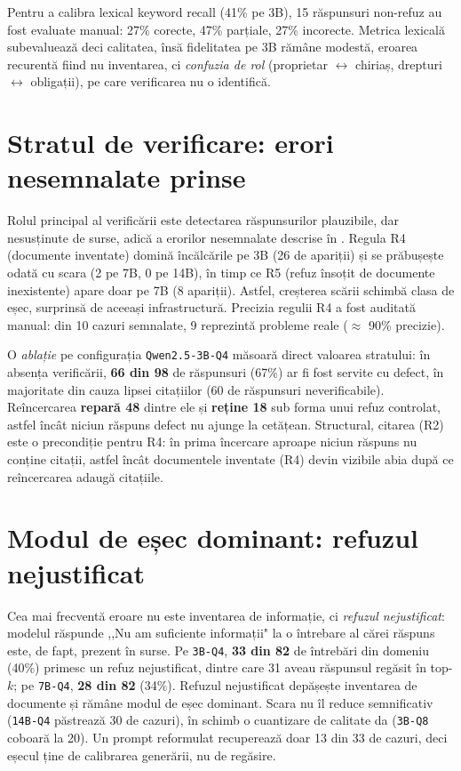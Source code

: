 Pentru a calibra lexical keyword recall (41\% pe 3B), 15 răspunsuri non-refuz au fost evaluate manual: 27\% corecte, 47\% parțiale, 27\% incorecte. Metrica lexicală subevaluează deci calitatea, însă fidelitatea pe 3B rămâne modestă, eroarea recurentă fiind nu inventarea, ci \emph{confuzia de rol} (proprietar $\leftrightarrow$ chiriaș, drepturi $\leftrightarrow$ obligații), pe care verificarea nu o identifică.

\section{Stratul de verificare: erori nesemnalate prinse}

Rolul principal al verificării este detectarea răspunsurilor plauzibile, dar nesusținute de surse, adică a erorilor nesemnalate descrise în \cite{gheorghe2026robust}. Regula R4 (documente inventate) domină încălcările pe 3B (26 de apariții) și se prăbușește odată cu scara (2 pe 7B, 0 pe 14B), în timp ce R5 (refuz însoțit de documente inexistente) apare doar pe 7B (8 apariții). Astfel, creșterea scării schimbă clasa de eșec, surprinsă de aceeași infrastructură. Precizia regulii R4 a fost auditată manual: din 10 cazuri semnalate, 9 reprezintă probleme reale ($\approx$ 90\% precizie).

O \emph{ablație} pe configurația \texttt{Qwen2.5-3B-Q4} măsoară direct valoarea stratului: în absența verificării, \textbf{66 din 98} de răspunsuri (67\%) ar fi fost servite cu defect, în majoritate din cauza lipsei citațiilor (60 de răspunsuri neverificabile). Reîncercarea \textbf{repară 48} dintre ele și \textbf{reține 18} sub forma unui refuz controlat, astfel încât niciun răspuns defect nu ajunge la cetățean. Structural, citarea (R2) este o precondiție pentru R4: în prima încercare aproape niciun răspuns nu conține citații, astfel încât documentele inventate (R4) devin vizibile abia după ce reîncercarea adaugă citațiile.

\section{Modul de eșec dominant: refuzul nejustificat}
\label{sec:nejustificat}

Cea mai frecventă eroare nu este inventarea de informație, ci \emph{refuzul nejustificat}: modelul răspunde ,,Nu am suficiente informații" la o întrebare al cărei răspuns este, de fapt, prezent în surse. Pe \texttt{3B-Q4}, \textbf{33 din 82} de întrebări din domeniu (40\%) primesc un refuz nejustificat, dintre care 31 aveau răspunsul regăsit în top-$k$; pe \texttt{7B-Q4}, \textbf{28 din 82} (34\%). Refuzul nejustificat depășește inventarea de documente și rămâne modul de eșec dominant. Scara nu îl reduce semnificativ (\texttt{14B-Q4} păstrează 30 de cazuri), în schimb o cuantizare de calitate da (\texttt{3B-Q8} coboară la 20). Un prompt reformulat recuperează doar 13 din 33 de cazuri, deci eșecul ține de calibrarea generării, nu de regăsire.

